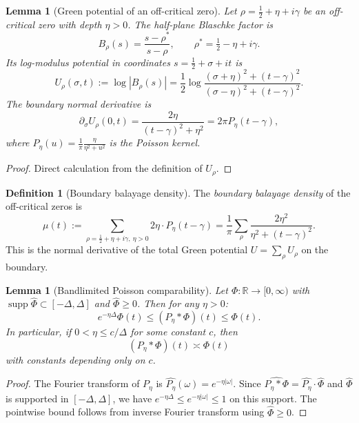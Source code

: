 \documentclass[11pt]{article}
\newtheorem{lemma}[theorem]{Lemma}
\theoremstyle{definition}
\newtheorem{definition}[theorem]{Definition}
\theoremstyle{remark}
\theoremstyle{definition}
\begin{document}
\begin{lemma}[Green potential of an off-critical zero]\label{lem:green-potential}
Let $\rho = \tfrac12 + \eta + i\gamma$ be an off-critical zero with depth $\eta > 0$. The half-plane Blaschke factor is
\[
  B_\rho(s) = \frac{s - \rho^*}{s - \rho}, \qquad \rho^* = \tfrac12 - \eta + i\gamma.
\]
Its log-modulus potential in coordinates $s = \tfrac12 + \sigma + it$ is
\[
  U_\rho(\sigma, t) := \log|B_\rho(s)| = \frac{1}{2}\log\frac{(\sigma + \eta)^2 + (t-\gamma)^2}{(\sigma - \eta)^2 + (t-\gamma)^2}.
\]
The boundary normal derivative is
\begin{equation}\label{eq:boundary-normal-derivative}
  \partial_\sigma U_\rho(0, t) = \frac{2\eta}{(t-\gamma)^2 + \eta^2} = 2\pi P_\eta(t - \gamma),
\end{equation}
where $P_\eta(u) = \frac{1}{\pi}\frac{\eta}{\eta^2 + u^2}$ is the Poisson kernel.
\end{lemma}

\begin{proof}
Direct calculation from the definition of $U_\rho$.
\end{proof}

\begin{definition}[Boundary balayage density]
The \emph{boundary balayage density} of the off-critical zeros is
\[
  \mu(t) := \sum_{\rho = \tfrac12 + \eta + i\gamma,\ \eta > 0} 2\eta \cdot P_\eta(t - \gamma) = \frac{1}{\pi}\sum_{\rho} \frac{2\eta^2}{\eta^2 + (t-\gamma)^2}.
\]
This is the normal derivative of the total Green potential $U = \sum_\rho U_\rho$ on the boundary.
\end{definition}

\begin{lemma}[Bandlimited Poisson comparability]\label{lem:poisson-comparability}
Let $\Phi: \mathbb{R} \to [0, \infty)$ with $\operatorname{supp}\widehat{\Phi} \subset [-\Delta, \Delta]$ and $\widehat{\Phi} \ge 0$. Then for any $\eta > 0$:
\[
  e^{-\eta\Delta} \Phi(t) \le (P_\eta * \Phi)(t) \le \Phi(t).
\]
In particular, if $0 < \eta \le c/\Delta$ for some constant $c$, then
\[
  (P_\eta * \Phi)(t) \asymp \Phi(t)
\]
with constants depending only on $c$.
\end{lemma}

\begin{proof}
The Fourier transform of $P_\eta$ is $\widehat{P_\eta}(\omega) = e^{-\eta|\omega|}$. Since $\widehat{P_\eta * \Phi} = \widehat{P_\eta} \cdot \widehat{\Phi}$ and $\widehat{\Phi}$ is supported in $[-\Delta, \Delta]$, we have $e^{-\eta\Delta} \le e^{-\eta|\omega|} \le 1$ on this support. The pointwise bound follows from inverse Fourier transform using $\widehat{\Phi} \ge 0$.
\end{proof}
\end{document}
